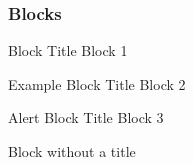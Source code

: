 \begin{frame}
	\frametitle{Blocks}
    	\begin{block}{Block Title}
    		Block 1
    	\end{block}
    	
    	\begin{exampleblock}{Example Block Title}
    		Block 2
    	\end{exampleblock}
    	
    	\begin{alertblock}{Alert Block Title}
    		Block 3
    	\end{alertblock}
    	
    	\begin{block}{}
    		Block without a title
    	\end{block}
\end{frame}
